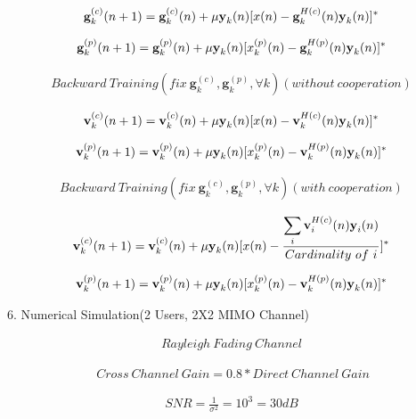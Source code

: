 \documentclass[11pt, oneside]{article}   	%
\begin{document}
\begin{align*}
\textbf{g}^{(c)}_{k}(n+1)= \textbf{g}^{(c)}_{k}(n)+ \mu \textbf y_k(n) [x(n)- \textbf{g}^{H(c)}_{k}(n) \textbf y_k(n)]^*
\end{align*}

\begin{align*}
\textbf{g}^{(p)}_{k}(n+1)= \textbf{g}^{(p)}_{k}(n)+ \mu \textbf y_k(n) [x_k^{(p)}(n)- \textbf{g}^{H(p)}_{k}(n) \textbf y_k(n)]^*
\end{align*}

\begin{align*}
Backward\ Training (fix\  \textbf{g}^{(c)}_{k}, \textbf{g}^{(p)}_{k}, \forall k)(without\ cooperation)
\end{align*}

\begin{align*}
\textbf{v}^{(c)}_{k}(n+1)= \textbf{v}^{(c)}_{k}(n)+ \mu \textbf y_k(n) [x(n)- \textbf{v}^{H(c)}_{k}(n) \textbf y_k(n)]^*
\end{align*}

\begin{align*}
\textbf{v}^{(p)}_{k}(n+1)= \textbf{v}^{(p)}_{k}(n)+ \mu \textbf y_k(n) [x_k^{(p)}(n)- \textbf{v}^{H(p)}_{k}(n) \textbf y_k(n)]^*
\end{align*}

\begin{align*}
Backward\ Training (fix\  \textbf{g}^{(c)}_{k}, \textbf{g}^{(p)}_{k}, \forall k)(with\ cooperation)
\end{align*}

\begin{align*}
\textbf{v}^{(c)}_{k}(n+1)= \textbf{v}^{(c)}_{k}(n)+ \mu \textbf y_k(n) [x(n)- \frac {\displaystyle\sum_{i}\textbf{v}^{H(c)}_{i}(n) \textbf y_i(n)}	{Cardinality\ of \ i}]^*
\end{align*}

\begin{align*}
\textbf{v}^{(p)}_{k}(n+1)= \textbf{v}^{(p)}_{k}(n)+ \mu \textbf y_k(n) [x_k^{(p)}(n)- \textbf{v}^{H(p)}_{k}(n) \textbf y_k(n)]^*
\end{align*}

6. Numerical Simulation(2 Users, 2X2 MIMO Channel)


\begin{align*}
Rayleigh\ Fading\ Channel
\end{align*}

\begin{align*}
\ Cross\ Channel\ Gain = 0.8*Direct\ Channel\ Gain
\end{align*}

\begin{align*}
SNR = \frac {1}{\sigma^2} = 10^3=30dB
\end{align*}


 
\end{document}
